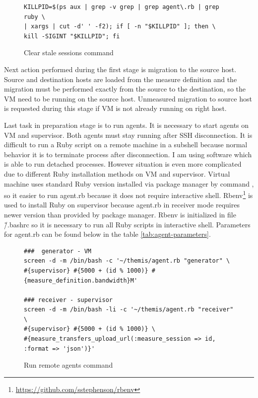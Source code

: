 \begin{figure}[htb]
\label{cmd:killcmd}
\begin{verbatim}
KILLPID=$(ps aux | grep -v grep | grep agent\.rb | grep ruby \
| xargs | cut -d' ' -f2); if [ -n "$KILLPID" ]; then \
kill -SIGINT "$KILLPID"; fi 
\end{verbatim}
\caption{Clear stale sessions command}
\end{figure}

Next action performed during the first stage is migration to the source host. Source and destination hosts are loaded from the measure definition and the migration must be performed exactly from the source to the destination, so the \Ac{VM} need to be running on the source host. Unmeasured migration to source host is requested during this stage if \Ac{VM} is not already running on right host.

Last task in preparation stage is to run agents. It is necessary to start agents on \Ac{VM} and supervisor. Both agents must stay running after \Ac{SSH} disconnection. It is difficult to run a Ruby script on a remote machine in a subshell because normal behavior it is to terminate process after disconnection. I am using \Cmd{screen} software which is able to run detached processes. However situation is even more complicated due to different Ruby installation methods on \Ac{VM} and supervisor. Virtual machine uses standard Ruby version installed via package manager by command , so it easier to run agent.rb because it does not require interactive shell. Rbenv\footnote{\url{https://github.com/sstephenson/rbenv}} is used to install Ruby on supervisor because agent.rb in receiver mode requires newer version than provided by package manager. Rbenv is initialized in file \~/.bashrc so it is necessary to run all Ruby scripts in interactive shell. Parameters for agent.rb can be found below in the table \ref{tab:agent-parameters}.

\begin{figure}[htb]
\caption{Run remote agents command}
\label{cmd:remote agents}
\begin{verbatim}
###  generator - VM
screen -d -m /bin/bash -c '~/themis/agent.rb "generator" \
#{supervisor} #{5000 + (id % 1000)} #{measure_definition.bandwidth}M'

### receiver - supervisor
screen -d -m /bin/bash -li -c '~/themis/agent.rb "receiver" \
#{supervisor} #{5000 + (id % 1000)} \
#{measure_transfers_upload_url(:measure_session => id, :format => 'json')}'
\end{verbatim}
\end{figure}

